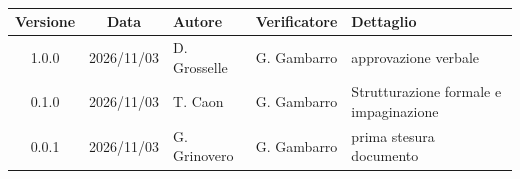 \\[0.5cm]

\renewcommand{\arraystretch}{1.3}
\noindent\begin{tabularx}{\textwidth}{|c|c|>{\raggedright\arraybackslash}p{2.8cm}|>{\raggedright\arraybackslash}p{2.8cm}|X|}
    \hline
    \textbf{Versione} & \textbf{Data} & \textbf{Autore} & \textbf{Verificatore} & \textbf{Dettaglio} \\
    \hline
    1.0.0 & 2026/11/03 & D. Grosselle & G. Gambarro  & approvazione verbale\\
    \hline
    0.1.0 & 2026/11/03 & T. Caon & G. Gambarro & Strutturazione formale e impaginazione \\
    \hline
    0.0.1 & 2026/11/03 & G. Grinovero & G. Gambarro & prima stesura documento \\
    \hline
\end{tabularx}
\newpage
